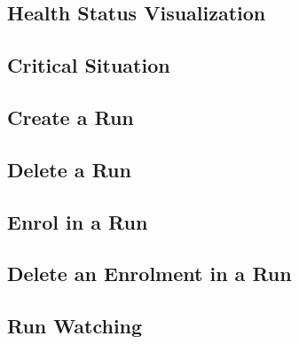 \subsection{Health Status Visualization}

\clearpage

\subsection{Critical Situation}

\clearpage

\subsection{Create a Run}

\clearpage

\subsection{Delete a Run}

\clearpage

\subsection{Enrol in a Run}

\clearpage

\subsection{Delete an Enrolment in a Run}

\clearpage

\subsection{Run Watching}

\clearpage
